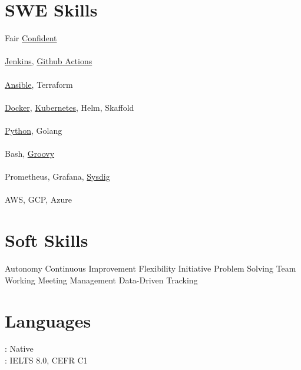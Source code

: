\documentclass[]{deedy-resume-openfont}
\begin{document}
\begin{minipage}[t]{0.33\textwidth}

\section{SWE Skills}
Fair \textbullet{} \underline{Confident}\\
\vspace{\topsep} %
\\\underline{Jenkins}, \underline{Github Actions}\\
\\\underline{Ansible}, Terraform \\
\\\underline{Docker}, \underline{Kubernetes}, Helm, Skaffold \\
\\\underline{Python}, Golang \\
\\Bash, \underline{Groovy} \\
\\Prometheus, Grafana, \underline{Sysdig} \\
\\AWS, GCP, Azure \\

\section{Soft Skills}
Autonomy \textbullet{} Continuous Improvement \textbullet{} Flexibility \textbullet{}
Initiative \textbullet{} Problem Solving \textbullet{} Team Working \textbullet{} Meeting Management
\textbullet{} Data-Driven Tracking
\sectionsep
\section{Languages}
: Native\\
: IELTS 8.0, CEFR C1
\sectionsep

%
%

\end{minipage}
\vline
\hspace{0.01\textwidth}
\end{document}
